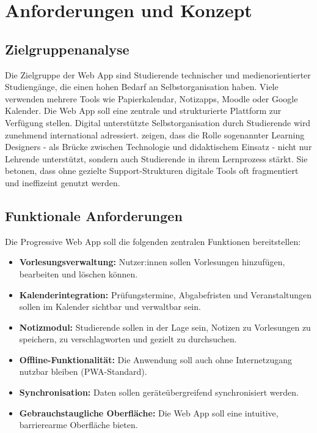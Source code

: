 \chapter{Anforderungen und Konzept}
\section{Zielgruppenanalyse}
Die Zielgruppe der Web App sind Studierende technischer und medienorientierter Studiengänge, die einen hohen Bedarf an Selbstorganisation haben. Viele verwenden mehrere Tools wie Papierkalendar, Notizapps, Moodle oder Google Kalender. Die Web App soll eine zentrale und strukturierte Plattform zur Verfügung stellen.\newline \newline
Digital unterstützte Selbstorganisation durch Studierende wird zunehmend international adressiert. \textcite{obexer} zeigen, dass die Rolle sogenannter Learning Designers - als Brücke zwischen Technologie und didaktischem Einsatz - nicht nur Lehrende unterstützt, sondern auch Studierende in ihrem Lernprozess stärkt. Sie betonen, dass ohne gezielte Support-Strukturen digitale Tools oft fragmentiert und ineffizeint genutzt werden. 
\section{Funktionale Anforderungen}
Die Progressive Web App soll die folgenden zentralen Funktionen bereitstellen:

\begin{itemize}
  \item \textbf{Vorlesungsverwaltung:} Nutzer:innen sollen Vorlesungen hinzufügen, bearbeiten und löschen können.
  \item \textbf{Kalenderintegration:} Prüfungstermine, Abgabefristen und Veranstaltungen sollen im Kalender sichtbar und verwaltbar sein.
  \item \textbf{Notizmodul:} Studierende sollen in der Lage sein, Notizen zu Vorlesungen zu speichern, zu verschlagworten und gezielt zu durchsuchen.
  \item \textbf{Offline-Funktionalität:} Die Anwendung soll auch ohne Internetzugang nutzbar bleiben (PWA-Standard).
  \item \textbf{Synchronisation:} Daten sollen geräteübergreifend synchronisiert werden.
  \item \textbf{Gebrauchstaugliche Oberfläche:} Die Web App soll eine intuitive, barrierearme Oberfläche bieten.
\end{itemize}
